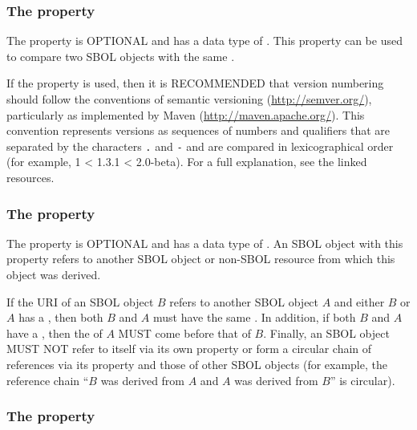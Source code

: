 \subsubsection*{The  property}
\label{sec:version}

The  property is OPTIONAL and has a data type of . This property can be used to compare two SBOL objects with the same .

If the  property is used, then it is RECOMMENDED that version numbering should follow the conventions of semantic versioning (\url{http://semver.org/}), particularly as implemented by Maven (\url{http://maven.apache.org/}).
This convention represents versions as sequences of numbers and qualifiers that are separated by the characters {\tt .} and {\tt -} and are compared in lexicographical order (for example, 1 < 1.3.1 < 2.0-beta).
For a full explanation, see the linked resources.

\subsubsection*{The  property}
\label{sec:wasDerivedFrom}

The  property is OPTIONAL and has a data type of . An SBOL object with this property refers to another SBOL object or non-SBOL resource from which this object was derived. 

If the  URI of an SBOL object $B$ refers to another SBOL object $A$ and either $B$ or $A$ has a , then both $B$ and $A$ must have the same  . In addition, if both $B$ and $A$ have a , then the   of $A$ MUST come before that of $B$. Finally, an SBOL object MUST NOT refer to itself via its own   property or form a circular chain of references via its  property and those of other SBOL objects (for example, the reference chain ``$B$ was derived from $A$ and $A$ was derived from $B$'' is circular).

\subsubsection*{The  property}
\label{sec:name}


